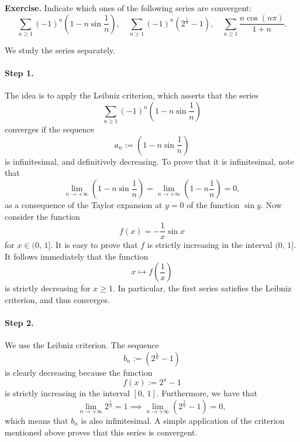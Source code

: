 \documentclass[a4paper,10 pt]{report}
\theoremstyle{definition}
\begin{document}
\begin{exerciseBox} \textbf{Exercise.}  Indicate which ones of the following series are convergent:
\begin{equation*}\sum_{n \geq 1} (-1)^n \left(1 - n \sin \frac{1}{n} \right), \quad \sum_{n \geq 1} (-1)^n(2^{\frac{1}{n}} - 1), \quad \sum_{n \geq 1} \frac{n \cos(n \pi)}{1 + n}.\end{equation*} \end{exerciseBox}

\begin{solutionBox} We study the series separately.

\paragraph{Step 1.} The idea is to apply the Leibniz criterion, which asserts that the series
\begin{equation*}\sum_{n \geq 1} (-1)^n \left(1 - n \sin \frac{1}{n} \right)\end{equation*}
converges if the sequence
\begin{equation*}a_n := \left(1 - n \sin \frac{1}{n} \right) \end{equation*}
is infinitesimal, and definitively decreasing. To prove that it is infinitesimal, note that
\begin{equation*}\lim_{n \to + \infty} \left(1 - n \sin \frac{1}{n} \right) = \lim_{n \to + \infty} \left(1 - n \frac{1}{n} \right) = 0, \end{equation*}
as a consequence of the Taylor expansion at $y = 0$ of the function $\sin y$. Now consider the function
\begin{equation*} f(x) = - \frac{1}{x} \sin x \end{equation*}
for $x \in (0, \, 1]$. It is easy to prove that $f$ is strictly increasing in the interval $(0, \, 1]$. It follows immediately that the function
\begin{equation*} x \longmapsto f( \frac{1}{x} ) \end{equation*}
is strictly decreasing for $x \geq 1$. In particular, the first series satisfies the Leibniz criterion, and thus converges.

\paragraph{Step 2.} We use the Leibniz criterion. The sequence
\begin{equation*}b_n := (2^{\frac{1}{n}} - 1)\end{equation*}
is clearly decreasing because the function
\begin{equation*} f(x) := 2^x - 1 \end{equation*}
is strictly increasing in the interval $[0, \, 1]$. Furthermore, we have that
\begin{equation*} \lim_{n \to + \infty} 2^{\frac{1}{n}} = 1 \implies \lim_{n \to + \infty} (2^{\frac{1}{n}} - 1) = 0, \end{equation*}
which means that $b_n$ is also infinitesimal. A simple application of the criterion mentioned above proves that this series is convergent.


\end{solutionBox}
\end{document}
